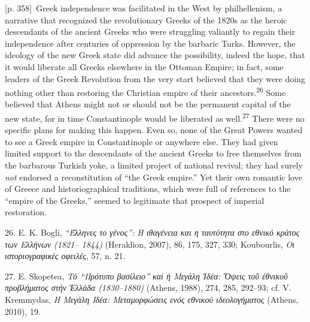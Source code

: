 \documentclass[10pt,a4paper]{article}
\begin{document}
{\scriptsize\color{gray}[p. 358]}\ Greek independence was facilitated in the West by philhellenism, a narrative that recognized the revolutionary Greeks of the 1820s as the heroic descendants of the ancient Greeks who were struggling valiantly to regain their independence after centuries of oppression by the barbaric Turks. However, the ideology of the new Greek state did advance the possibility, indeed the hope, that it would liberate all Greeks elsewhere in the Ottoman Empire; in fact, some leaders of the Greek Revolution from the very start believed that they were doing nothing other than restoring the Christian empire of their ancestors.\nobreak\textsuperscript{26} Some believed that Athens might not or should not be the permanent capital of the new state, for in time Constantinople would be liberated as well.\nobreak\textsuperscript{27} There were no specific plans for making this happen. Even so, none of the Great Powers wanted to see a Greek empire in Constantinople or anywhere else. They had given limited support to the descendants of the ancient Greeks to free themselves from the barbarous Turkish yoke, a limited project of national revival; they had surely \textit{not} endorsed a reconstitution of “the Greek empire.” Yet their own romantic love of Greece and historiographical traditions, which were full of references to the “empire of the Greeks,” seemed to legitimate that prospect of imperial restoration.\par{\small 26. E. K. Bogli, \textit{“Έλληνες το γένος”: Η ιθαγένεια και η ταυτότητα στο εθνικό κράτος των Ελλήνων (1821– 1844)} (Heraklion, 2007), 86, 175, 327, 330; Koubourlis, \textit{Οι ιστοριογραφικές οφειλές}, 57, n. 21.\par}{\small 27. E. Skopetea, \textit{Τό “Πρότυπο βασίλειο” καί ἡ Μεγάλη Ἰδέα: Ὄψεις τοῦ ἐθνικοῦ προβλήματος στήν Ἐλλάδα (1830–1880)} (Athens, 1988), 274, 285, 292–93; cf. V. Kremmydas, \textit{Η Μεγάλη Ιδέα: Μεταμορφώσεις ενός εθνικού ιδεολογήματος} (Athens, 2010), 19.\par}
\end{document}
